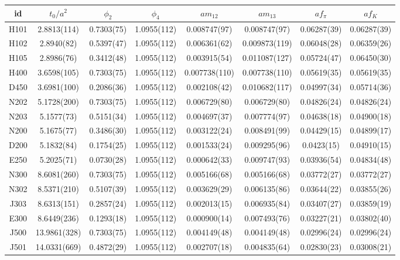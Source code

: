 \begin{sidewaystable}
\begin{center}
    \begin{tabular}{c c c c c c c c}
id & $t_0/a^2$ & $\phi_2$ & $\phi_4$ & $am_{12}$ & $am_{13}$ & $af_{\pi}$ & $af_K$ \\
\toprule
H101 & 2.8813(114) & 0.7303(75) & 1.0955(112) & 0.008747(97) & 0.008747(97) & 0.06287(39) & 0.06287(39) \\
H102 & 2.8940(82) & 0.5397(47) & 1.0955(112) & 0.006361(62) & 0.009873(119) & 0.06048(28) & 0.06359(26) \\
H105 & 2.8986(76) & 0.3412(48) & 1.0955(112) & 0.003915(54) & 0.011087(127) & 0.05724(47) & 0.06450(30) \\
\midrule
H400 & 3.6598(105) & 0.7303(75) & 1.0955(112) & 0.007738(110) & 0.007738(110) & 0.05619(35) & 0.05619(35) \\
D450 & 3.6981(100) & 0.2086(36) & 1.0955(112) & 0.002108(42) & 0.010682(117) & 0.04997(34) & 0.05714(36) \\
\midrule
N202 & 5.1728(200) & 0.7303(75) & 1.0955(112) & 0.006729(80) & 0.006729(80) & 0.04826(24) & 0.04826(24) \\
N203 & 5.1577(73) & 0.5151(34) & 1.0955(112) & 0.004697(37) & 0.007774(97) & 0.04638(18) & 0.04900(18) \\
N200 & 5.1675(77) & 0.3486(30) & 1.0955(112) & 0.003122(24) & 0.008491(99) & 0.04429(15) & 0.04899(17) \\
D200 & 5.1832(84) & 0.1754(25) & 1.0955(112) & 0.001533(24) & 0.009295(96) & 0.0423(15) & 0.04910(15) \\
E250 & 5.2025(71) & 0.0730(28) & 1.0955(112) & 0.000642(33) & 0.009747(93) & 0.03936(54) & 0.04834(48) \\
\midrule
N300 & 8.6081(260) & 0.7303(75) & 1.0955(112) & 0.005166(68) & 0.005166(68) & 0.03772(27) & 0.03772(27) \\
N302 & 8.5371(210) & 0.5107(39) & 1.0955(112) & 0.003629(29) & 0.006135(86) & 0.03644(22) & 0.03855(26) \\
J303 & 8.6313(151) & 0.2857(24) & 1.0955(112) & 0.002013(15) & 0.006935(84) & 0.03407(27) & 0.03859(19) \\
E300 & 8.6449(236) & 0.1293(18) & 1.0955(112) & 0.000900(14) & 0.007493(76) & 0.03227(21) & 0.03802(40) \\
\midrule
J500 & 13.9861(328) & 0.7303(75) & 1.0955(112) & 0.004149(48) & 0.004149(48) & 0.02996(24) & 0.02996(24) \\
J501 & 14.0331(669) & 0.4872(29) & 1.0955(112) & 0.002707(18) & 0.004835(64) & 0.02830(23) & 0.03008(21) \\

\end{tabular}
\end{center}
\end{sidewaystable}
